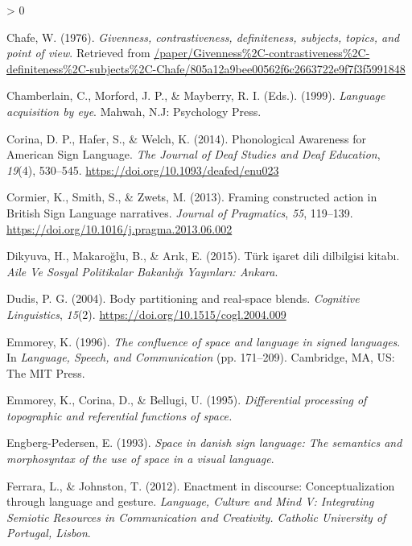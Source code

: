 \documentclass[
  english,
  doc,mask]{apa6}
\newlength{\cslhangindent}
\newenvironment{CSLReferences}[2] %
 {%
  \setlength{\parindent}{0pt}
  \ifodd #1 \everypar{\setlength{\hangindent}{\cslhangindent}}\ignorespaces\fi
  \ifnum #2 > 0
  \setlength{\parskip}{#2\baselineskip}
  \fi
 }%
 {}
\begin{document}
\begin{CSLReferences}{1}{0}
\leavevmode\hypertarget{ref-chafe1976}{}%
Chafe, W. (1976). \emph{Givenness, contrastiveness, definiteness, subjects, topics, and point of view}. Retrieved from \href{https:///paper/Givenness\%2C-contrastiveness\%2C-definiteness\%2C-subjects\%2C-Chafe/805a12a9bee00562f6c2663722e9f7f3f5991848}{/paper/Givenness\%2C-contrastiveness\%2C-definiteness\%2C-subjects\%2C-Chafe/805a12a9bee00562f6c2663722e9f7f3f5991848}

\leavevmode\hypertarget{ref-chamberlain_language_1999}{}%
Chamberlain, C., Morford, J. P., \& Mayberry, R. I. (Eds.). (1999). \emph{Language acquisition by eye}. Mahwah, N.J: Psychology Press.

\leavevmode\hypertarget{ref-corina2014}{}%
Corina, D. P., Hafer, S., \& Welch, K. (2014). Phonological Awareness for American Sign Language. \emph{The Journal of Deaf Studies and Deaf Education}, \emph{19}(4), 530--545. \url{https://doi.org/10.1093/deafed/enu023}

\leavevmode\hypertarget{ref-cormier2013}{}%
Cormier, K., Smith, S., \& Zwets, M. (2013). Framing constructed action in British Sign Language narratives. \emph{Journal of Pragmatics}, \emph{55}, 119--139. \url{https://doi.org/10.1016/j.pragma.2013.06.002}

\leavevmode\hypertarget{ref-dikyuva2015}{}%
Dikyuva, H., Makaroğlu, B., \& Arık, E. (2015). Türk i{ş}aret dili dilbilgisi kitab{ı}. \emph{Aile Ve Sosyal Politikalar Bakanl{ı}{ğ}{ı} Yay{ı}nlar{ı}: Ankara}.

\leavevmode\hypertarget{ref-dudis2004}{}%
Dudis, P. G. (2004). Body partitioning and real-space blends. \emph{Cognitive Linguistics}, \emph{15}(2). \url{https://doi.org/10.1515/cogl.2004.009}

\leavevmode\hypertarget{ref-emmorey1996}{}%
Emmorey, K. (1996). \emph{The confluence of space and language in signed languages}. In \emph{Language, Speech, and Communication} (pp. 171--209). Cambridge, MA, US: The MIT Press.

\leavevmode\hypertarget{ref-emmorey1995}{}%
Emmorey, K., Corina, D., \& Bellugi, U. (1995). \emph{Differential processing of topographic and referential functions of space.}

\leavevmode\hypertarget{ref-engberg-pedersen1993}{}%
Engberg-Pedersen, E. (1993). \emph{Space in danish sign language: The semantics and morphosyntax of the use of space in a visual language}.

\leavevmode\hypertarget{ref-ferrara2012}{}%
Ferrara, L., \& Johnston, T. (2012). Enactment in discourse: Conceptualization through language and gesture. \emph{Language, Culture and Mind V: Integrating Semiotic Resources in Communication and Creativity. Catholic University of Portugal, Lisbon}.


\end{CSLReferences}
\end{document}
